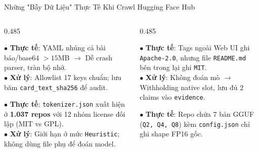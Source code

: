 \documentclass[aspectratio=169, xcolor=table]{beamer}
\begin{document}
\begin{frame}{Những "Bẫy Dữ Liệu" Thực Tế Khi Crawl Hugging Face Hub}
    \vspace{-0.15cm}
    \begin{columns}[onlytextwidth, T]
        \begin{column}{0.485\textwidth}
            \begin{warnbox}
                \scriptsize
                $\bullet$ \textbf{Thực tế}: YAML nhúng cả bài báo/base64 $>15$MB $\to$ Dễ crash parser, tràn bộ nhớ.\\[3pt]
                $\bullet$ \textbf{Xử lý}: Allowlist 17 keys chuẩn; lưu băm \texttt{card\_text\_sha256} để audit.
            \end{warnbox}
            \vspace{0.08cm}
            \begin{warnbox}
                \scriptsize
                $\bullet$ \textbf{Thực tế}: \texttt{tokenizer.json} xuất hiện ở \textbf{1.037 repos} với 12 nhóm license đối lập (MIT vs GPL).\\[3pt]
                $\bullet$ \textbf{Xử lý}: Giới hạn ở mức \texttt{Heuristic}; không dùng file phụ để đoán model.
            \end{warnbox}
        \end{column}
        \hfill
        \begin{column}{0.485\textwidth}
            \begin{warnbox}
                \scriptsize
                $\bullet$ \textbf{Thực tế}: Tags ngoài Web UI ghi \texttt{Apache-2.0}, nhưng file \texttt{README.md} bên trong lại ghi \texttt{MIT}.\\[3pt]
                $\bullet$ \textbf{Xử lý}: Không đoán mò $\to$ Withholding native slot, lưu đủ 2 claims vào \texttt{evidence}.
            \end{warnbox}
            \vspace{0.08cm}
            \begin{warnbox}
                \scriptsize
                $\bullet$ \textbf{Thực tế}: Repo chứa 7 bản GGUF (\texttt{Q2, Q4, Q8}) kèm \texttt{config.json} chỉ ghi shape FP16 gốc.\\[3pt]

\end{warnbox}
\end{column}
\end{columns}
\end{frame}
\end{document}
